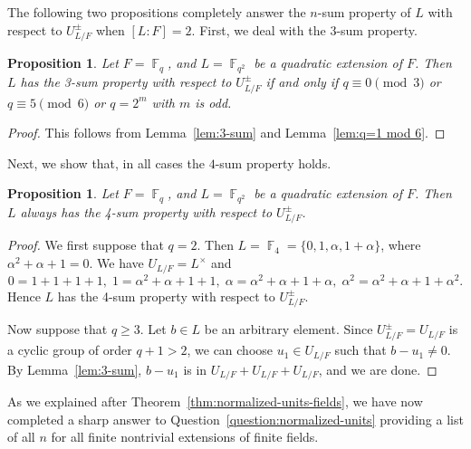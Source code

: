 \documentclass[11pt, a4paper]{amsart}
\newtheorem{prop}[thm]{Proposition}
\theoremstyle{definition}
\DeclareMathOperator{\F}{\mathbb{F}}
\numberwithin{equation}{section}
\begin{document}
The following two propositions completely answer the $n$-sum property of $L$ with respect to $U^\pm_{L/F}$ when $[L:F]=2.$ First, we deal with the $3$-sum property. 


\begin{prop}
\label{prop:quadratic 3-sum}
    Let $F=\F_q$, and  $L=\F_{q^2}$ be a quadratic extension of $F$. Then $L$ has the 3-sum property with respect to $U^\pm_{L/F}$ if and only if $q\equiv 0\pmod 3$ or $q \equiv 5 \pmod{6}$ or $q=2^m$ with $m$ is odd.
\end{prop}
\begin{proof} This follows from Lemma~\ref{lem:3-sum} and Lemma~\ref{lem:q=1 mod 6}.
\end{proof}
Next, we show that, in all cases the $4$-sum property holds. 
\begin{prop} \label{prop:degree-2}
    Let $F=\F_q$, and  $L=\F_{q^2}$ be a quadratic extension of $F$. Then $L$ always has the 4-sum property with respect to $U^\pm_{L/F}$.
\end{prop}
\begin{proof} We first suppose that $q=2$.  Then  $L=\F_4=\{0,1,\alpha,1+\alpha\}$, where $\alpha^2+\alpha+1=0$. We have $U_{L/F}=L^\times$ and 
\[
0=1+1+1+1, \;1= \alpha^2+\alpha+1 +1,\; \alpha= \alpha^2+\alpha+1 +\alpha,\; \alpha^2= \alpha^2+\alpha+1 +\alpha^2.
\]
Hence $L$ has the 4-sum property with respect to $U^\pm_{L/F}$.

Now suppose that $q\geq 3$. Let $b\in L$ be an arbitrary element. Since $U^\pm_{L/F}=U_{L/F}$ is a cyclic group of order $q+1>2$, we can choose $u_1\in U_{L/F}$ such that $b-u_1\not=0$. By Lemma~\ref{lem:3-sum}, $b-u_1$ is in $U_{L/F}+U_{L/F}+U_{L/F}$, and we are done.
\end{proof}
As we explained after Theorem~\ref{thm:normalized-units-fields}, we have now completed a sharp answer to Question~\ref{question:normalized-units} providing a list of all $n$ for all finite nontrivial extensions of finite fields.
\end{document}
